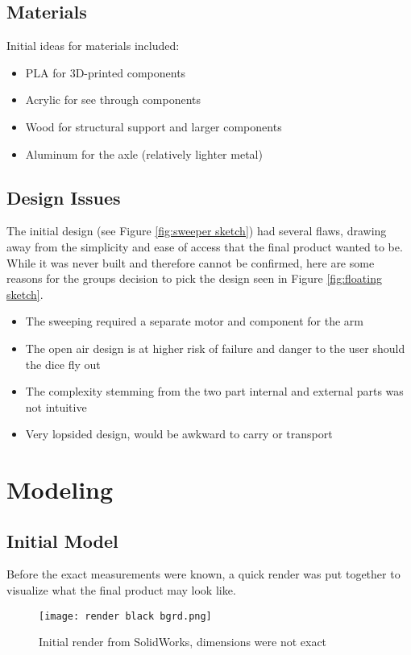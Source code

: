 \documentclass[12pt]{article}
\begin{document}
\subsection{Materials}
Initial ideas for materials included:
\begin{itemize}
    \item PLA for 3D-printed components
    \item Acrylic for see through components
    \item Wood for structural support and larger components
    \item Aluminum for the axle (relatively lighter metal)
\end{itemize}

\subsection{Design Issues}
The initial design (see Figure \ref{fig:sweeper sketch}) had several flaws, drawing away from the simplicity and ease of access that the final product wanted to be. While it was never built and therefore cannot be confirmed, here are some reasons for the groups decision to pick the design seen in Figure \ref{fig:floating sketch}.
\begin{itemize}
    \item The sweeping required a separate motor and component for the arm
    \item The open air design is at higher risk of failure and danger to the user should the dice fly out
    \item The complexity stemming from the two part internal and external parts was not intuitive
    \item Very lopsided design, would be awkward to carry or transport
\end{itemize}

\newpage
\section{Modeling}

\subsection{Initial Model}
Before the exact measurements were known, a quick render was put together to visualize what the final product may look like.
\begin{figure}[H]
\centering
    \texttt{[image: render black bgrd.png]}
    \caption{Initial render from SolidWorks, dimensions were not exact}
    \label{fig:black render}
\end{figure}
\end{document}
